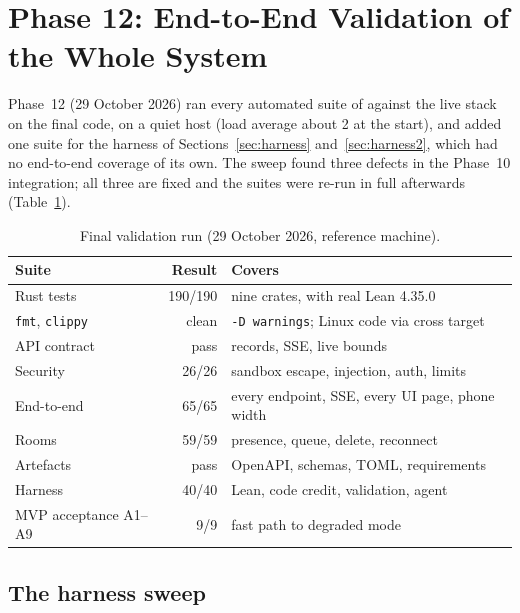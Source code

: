\section{Phase 12: End-to-End Validation of the Whole System}
\label{sec:sweep}

Phase~12 (29 October 2026) ran every automated suite of \Sys{} against the live
stack on the final code, on a quiet host (load average about 2 at the start), and
added one suite for the harness of Sections~\ref{sec:harness} and~\ref{sec:harness2},
which had no end-to-end coverage of its own.
The sweep found three defects in the Phase~10 integration; all three are fixed and
the suites were re-run in full afterwards (Table~\ref{tab:sweep}).

\begin{table}[t]
\centering
\caption{Final validation run (29 October 2026, reference machine).}
\label{tab:sweep}
\scriptsize
\begin{tabular}{@{}p{2.35cm}rp{3.1cm}@{}}
\toprule
Suite & Result & Covers \\
\midrule
Rust tests & 190/190 & nine crates, with real Lean 4.35.0 \\
\texttt{fmt}, \texttt{clippy} & clean & \texttt{-D warnings}; Linux code via cross target \\
API contract & pass & records, SSE, live bounds \\
Security & 26/26 & sandbox escape, injection, auth, limits \\
End-to-end & 65/65 & every endpoint, SSE, every UI page, phone width \\
Rooms & 59/59 & presence, queue, delete, reconnect \\
Artefacts & pass & OpenAPI, schemas, TOML, requirements \\
Harness & 40/40 & Lean, code credit, validation, agent \\
MVP acceptance A1--A9 & 9/9 & fast path to degraded mode \\
\bottomrule
\end{tabular}
\end{table}

\subsection{The harness sweep}

